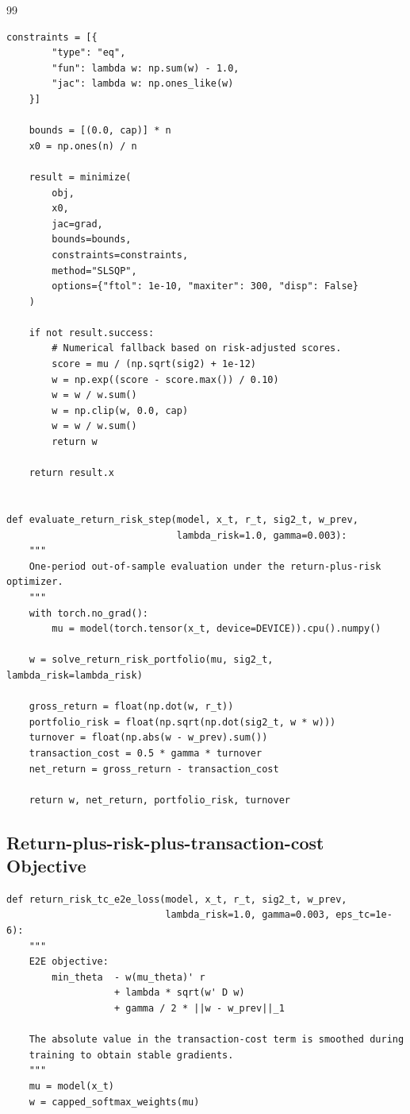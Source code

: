 \documentclass[11pt]{article}
\begin{document}
\begin{thebibliography}{99}
\begin{lstlisting}[style=appendixpython,caption={Core implementation of the return-plus-risk objective}]
    constraints = [{
        "type": "eq",
        "fun": lambda w: np.sum(w) - 1.0,
        "jac": lambda w: np.ones_like(w)
    }]

    bounds = [(0.0, cap)] * n
    x0 = np.ones(n) / n

    result = minimize(
        obj,
        x0,
        jac=grad,
        bounds=bounds,
        constraints=constraints,
        method="SLSQP",
        options={"ftol": 1e-10, "maxiter": 300, "disp": False}
    )

    if not result.success:
        # Numerical fallback based on risk-adjusted scores.
        score = mu / (np.sqrt(sig2) + 1e-12)
        w = np.exp((score - score.max()) / 0.10)
        w = w / w.sum()
        w = np.clip(w, 0.0, cap)
        w = w / w.sum()
        return w

    return result.x


def evaluate_return_risk_step(model, x_t, r_t, sig2_t, w_prev,
                              lambda_risk=1.0, gamma=0.003):
    """
    One-period out-of-sample evaluation under the return-plus-risk optimizer.
    """
    with torch.no_grad():
        mu = model(torch.tensor(x_t, device=DEVICE)).cpu().numpy()

    w = solve_return_risk_portfolio(mu, sig2_t, lambda_risk=lambda_risk)

    gross_return = float(np.dot(w, r_t))
    portfolio_risk = float(np.sqrt(np.dot(sig2_t, w * w)))
    turnover = float(np.abs(w - w_prev).sum())
    transaction_cost = 0.5 * gamma * turnover
    net_return = gross_return - transaction_cost

    return w, net_return, portfolio_risk, turnover
\end{lstlisting}

\subsection{Return-plus-risk-plus-transaction-cost Objective}

\begin{lstlisting}[style=appendixpython,caption={Core implementation of the return-plus-risk-plus-transaction-cost objective}]
def return_risk_tc_e2e_loss(model, x_t, r_t, sig2_t, w_prev,
                            lambda_risk=1.0, gamma=0.003, eps_tc=1e-6):
    """
    E2E objective:
        min_theta  - w(mu_theta)' r
                   + lambda * sqrt(w' D w)
                   + gamma / 2 * ||w - w_prev||_1

    The absolute value in the transaction-cost term is smoothed during
    training to obtain stable gradients.
    """
    mu = model(x_t)
    w = capped_softmax_weights(mu)


\end{lstlisting}
\end{thebibliography}
\end{document}
